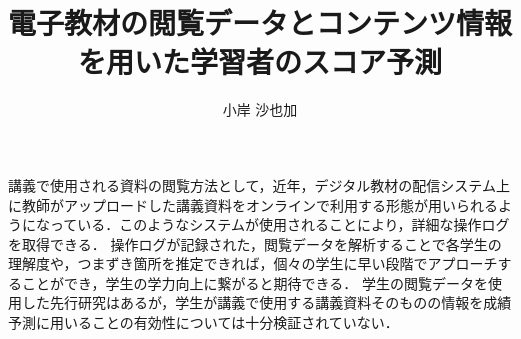 \documentclass[a4paper,12pt]{ltjsreport}
\title{電子教材の閲覧データとコンテンツ情報を用いた学習者のスコア予測}
\author{小岸 沙也加}
\begin{document}
\beforepreface



講義で使用される資料の閲覧方法として，近年，デジタル教材の配信システム上に教師がアップロードした講義資料をオンラインで利用する形態が用いられるようになっている．このようなシステムが使用されることにより，詳細な操作ログを取得できる．
操作ログが記録された，閲覧データを解析することで各学生の理解度や，つまずき箇所を推定できれば，個々の学生に早い段階でアプローチすることができ，学生の学力向上に繋がると期待できる．
学生の閲覧データを使用した先行研究はあるが，学生が講義で使用する講義資料そのものの情報を成績予測に用いることの有効性については十分検証されていない．
\end{document}
